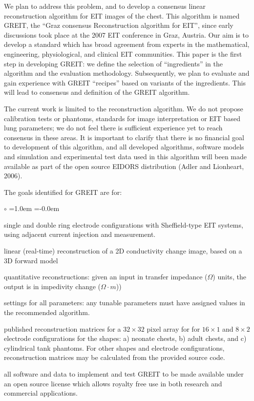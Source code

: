 \documentclass[letterpaper,twocolumn,10pt]{article}
\begin{document}
We plan to address this problem, and to develop a
consensus linear reconstruction algorithm for EIT
images of the chest.
This algorithm is named GREIT, 
the ``Graz consensus Reconstruction algorithm for EIT'',
since early discussions took place at the 2007 EIT conference
in Graz, Austria. Our aim is to develop a standard which
has broad agreement from experts in the mathematical,
engineering, physiological, and clinical EIT communities.
This paper is the first step in developing GREIT:
we define the selection of ``ingredients'' in the
algorithm and the evaluation 
methodology. Subsequently, we plan to evaluate
and gain experience with GREIT ``recipes'' based on 
variants of the ingredients. This will lead to 
consensus and definition of the GREIT algorithm.

The current work is limited to the reconstruction algorithm.
We do not propose calibration tests or phantoms, standards
for image interpretation or EIT based lung parameters; 
we do not feel there is sufficient experience yet to reach
consensus in these areas.
It is important to clarify that there is no financial
goal to development of this algorithm,
and all developed algorithms, software
models and simulation and experimental test data used
in this algorithm will been made available as part of
the open source EIDORS distribution (Adler and Lionheart, 2006).

The goals identified for GREIT are for:
\begin{list}{$\circ$} %
  {\leftmargin=1.0em \itemindent=-0.0em
    \baselineskip
    \baselineskip}
\item
 single and double ring electrode
configurations with Sheffield-type EIT systems, using
      adjacent current injection and measurement.
\item
 linear (real-time) reconstruction of a 2D conductivity
change image, based on a 3D forward model
\item
 quantitative reconstructions:
   given an input in transfer impedance ($\Omega$) units,
                    the output is in impedivity change ($\Omega\cdot m$))
\item
 settings for all parameters:
     any tunable parameters must have assigned
     values in the recommended algorithm.
\item
 published reconstruction matrices for
      a $32\times 32$ pixel array for
      for $16\times1$ and $8\times 2$
      electrode configurations for the shapes:
   a) neonate chests, 
   b) adult chests, and 
   c) cylindrical tank phantoms.
 For other shapes and electrode configurations,
   reconstruction matrices may be calculated from the
   provided source code.

\item
   all software and data to implement and test GREIT to be
   made available under an open source license which allows 
   royalty free use in both research and commercial applications.

\end{list}
\end{document}

